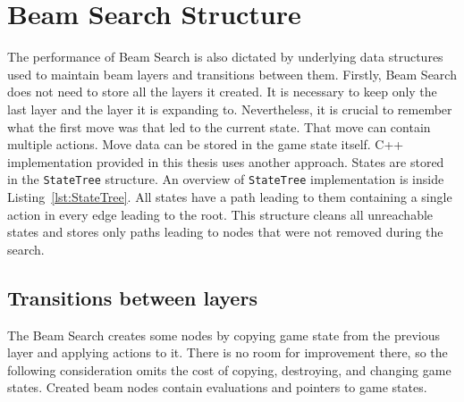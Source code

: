 \documentclass[shortabstract, mgr, english]{iithesis}
\begin{document}
\section{Beam Search Structure}
The performance of Beam Search is also dictated by underlying data structures used to maintain beam layers and transitions between them. Firstly, Beam Search does not need to store all the layers it created. It is necessary to keep only the last layer and the layer it is expanding to. Nevertheless, it is crucial to remember what the first move was that led to the current state. That move can contain multiple actions. Move data can be stored in the game state itself. C++ implementation provided in this thesis uses another approach. States are stored in the \texttt{StateTree} structure. An overview of \texttt{StateTree} implementation is inside Listing~\ref{lst:StateTree}. All states have a path leading to them containing a single action in every edge leading to the root. This structure cleans all unreachable states and stores only paths leading to nodes that were not removed during the search.

\subsection{Transitions between layers}

The Beam Search creates some nodes by copying game state from the previous layer and applying actions to it. There is no room for improvement there, so the following consideration omits the cost of copying, destroying, and changing game states. Created beam nodes contain evaluations and pointers to game states. 
\end{document}
